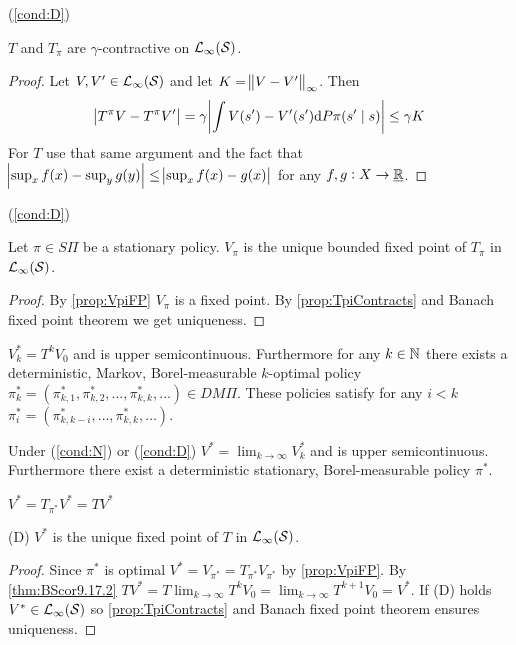 \begin{prop} (\cref{cond:D})

  $T$ and $T_\pi$ are $\gamma$-contractive on $\mathcal{L}_\infty(\mathcal{S})$.
  \label{prop:TpiContracts}
\end{prop}
\begin{proof}
  Let $V, V' \in \mathcal{L}_\infty(\mathcal{S})$
  and let $K = \norm{V - V'}_\infty$.
  Then
  \[ \abs{T^\pi V - T^\pi V'}
    = \gamma \abs{\int V(s') - V'(s') \mathrm{d} P\pi(s' \mid s)}
  \leq \gamma K \]
  For $T$ use that same argument and the fact that
  $\abs{\sup_x f(x) - \sup_{y} g(y)} \leq
  \abs{\sup_x f(x) - g(x)}$ for any $f,g : X \to \underline{\mathbb{R}}$.
\end{proof}

\begin{cor} (\cref{cond:D})

  Let $\pi \in S\Pi$ be a stationary policy.
  $V_\pi$ is the unique bounded fixed point of $T_\pi$
  in $\mathcal{L}_\infty(\mathcal{S})$.
\end{cor}
\begin{proof}
  By \cref{prop:VpiFP} $V_\pi$ is a fixed point.
  By \cref{prop:TpiContracts} and Banach fixed point theorem we get uniqueness.
\end{proof}

\begin{prop}[Prop. 8.6 in BS]
  $V^*_k = T^k V_0$ and is upper semicontinuous.
  Furthermore for any $k \in \mathbb{N}$
  there exists a deterministic, Markov, Borel-measurable $k$-optimal policy
  $\pi^*_k = (\pi^*_{k,1}, \pi^*_{k,2}, \dots, \pi^*_{k,k}, \dots) \in DM\Pi$.
  These policies satisfy for any $i < k$
  $\pi^*_{i} = (\pi^*_{k,k-i}, \dots, \pi^*_{k,k}, \dots)$.
\end{prop}


\begin{thm}[Cor. 9.17.2 in BS]
  Under (\cref{cond:N}) or (\cref{cond:D})
  $V^* = \lim_{k\to\infty} V_k^*$ and is upper semicontinuous.
  Furthermore there exist a deterministic
  stationary, Borel-measurable policy $\pi^*$.
  \label{thm:BScor9.17.2}
\end{thm}

\begin{prop}
  $V^* = T_{\pi^*} V^* = T V^*$
  
  (D) $V^*$ is the unique fixed point of $T$ in $\mathcal{L}_\infty(\mathcal{S})$.
\end{prop}
\begin{proof}
  Since $\pi^*$ is optimal $V^* = V_{\pi^*} = T_{\pi^*} V_{\pi^*}$ by
  \cref{prop:VpiFP}.
  By \cref{thm:BScor9.17.2} $T V^* = T \lim_{k\to\infty} T^k V_0 =
  \lim_{k\to\infty} T^{k+1} V_0 = V^*$.
  If (D) holds $V^* \in \mathcal{L}_\infty(\mathcal{S})$ so \cref{prop:TpiContracts}
  and Banach fixed point theorem ensures uniqueness.
\end{proof}

